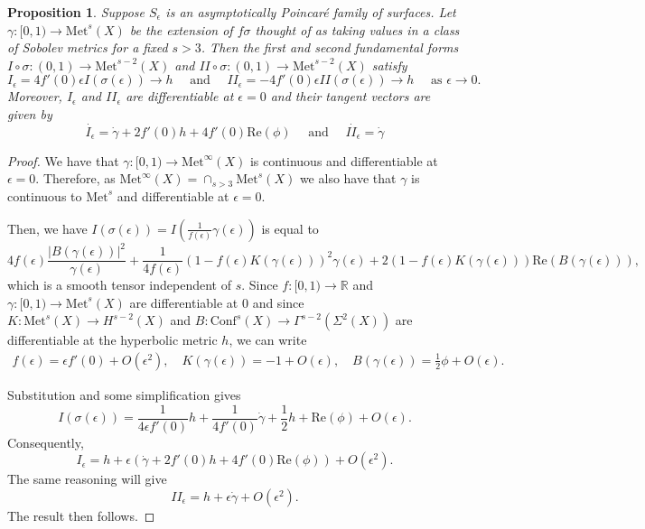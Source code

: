\documentclass{amsart}
\newcommand{\R}{\mathbb{R}}
\newtheorem{prop}[thm]{Proposition}
\newcommand{\two}{I\!\!I}
\begin{document}
\begin{prop}
\label{thm-in-sobolev}
Suppose $S_\epsilon$ is an asymptotically Poincar\'e family of surfaces. 
Let $\gamma : [0,1) \to \mathrm{Met}^s(X)$ be the extension of $f\sigma$ thought of as taking values in a class of Sobolev metrics for a fixed $s > 3$. 
Then the first and second fundamental forms $I \circ \sigma: (0,1) \to \mathrm{Met}^{s-2}(X)$ and  $\two \circ \sigma: (0,1) \to \mathrm{Met}^{s-2}(X)$ satisfy
\[
I_\epsilon = 4 f'(0) \epsilon I(\sigma(\epsilon)) \to h
\quad \text{ and } \quad
\two_\epsilon =  - 4 f'(0) \epsilon \two(\sigma(\epsilon)) \to h
\quad \text{ as } \epsilon \to 0.
\]
Moreover, $I_\epsilon$ and $\two_\epsilon$ are differentiable at $\epsilon = 0$ and their tangent vectors are given by 
\[
\dot{I_\epsilon} = \dot{\gamma} + 2 f'(0) h + 4 f'(0) \mathrm{Re}(\phi)
\quad \text{ and } \quad
\dot{\two_\epsilon} = \dot{\gamma}
\]
\end{prop}

\begin{proof}
We have that $\gamma:[0,1) \to \mathrm{Met}^\infty(X)$ is continuous and differentiable at $\epsilon = 0$. 
Therefore, as $\mathrm{Met}^\infty(X) = \cap_{s > 3} \mathrm{Met}^s(X)$ we also have that $\gamma$ is continuous to $\mathrm{Met}^s$ and differentiable at $\epsilon = 0$. 

Then, we have $I(\sigma(\epsilon)) = I(\frac{1}{f(\epsilon)} \gamma(\epsilon))$ is equal to 
\[
4 f(\epsilon) \frac{|B(\gamma(\epsilon))|^2}{\gamma(\epsilon)} + \frac{1}{4 f(\epsilon)}(1 - f(\epsilon) K(\gamma(\epsilon)))^2 \gamma(\epsilon) + 2(1 - f(\epsilon)K(\gamma(\epsilon)))\mathrm{Re}(B(\gamma(\epsilon))),
\]
which is a smooth tensor independent of $s$. 
Since $f:[0,1) \to \R$ and $\gamma:[0,1) \to \mathrm{Met}^s(X)$ are differentiable at 0 and since $K: \mathrm{Met}^s(X) \to H^{s-2}(X)$ and $B: \mathrm{Conf}^s(X) \to \Gamma^{s-2}(\Sigma^{2}(X))$ are differentiable at the hyperbolic metric $h$, we can write 
\begin{align*}
f(\epsilon) = \epsilon f'(0) + O(\epsilon^2), \quad
K(\gamma(\epsilon)) = -1 + O(\epsilon), \quad 
B(\gamma(\epsilon)) = \frac{1}{2} \phi + O(\epsilon).
\end{align*}

Substitution and some simplification gives 
\[
I(\sigma(\epsilon)) = \frac{1}{4\epsilon f'(0)} h + \frac{1}{4 f'(0)} \dot{\gamma} + \frac{1}{2} h + \mathrm{Re}(\phi) + O(\epsilon).
\]
Consequently, 
\[
I_\epsilon =  h + \epsilon(\dot{\gamma} + 2 f'(0)h + 4 f'(0) \mathrm{Re}(\phi)) + O(\epsilon^2).
\]
The same reasoning will give 
\[
\two_\epsilon = h + \epsilon \dot{\gamma} + O(\epsilon^2).
\]
The result then follows.
\end{proof}
\end{document}
